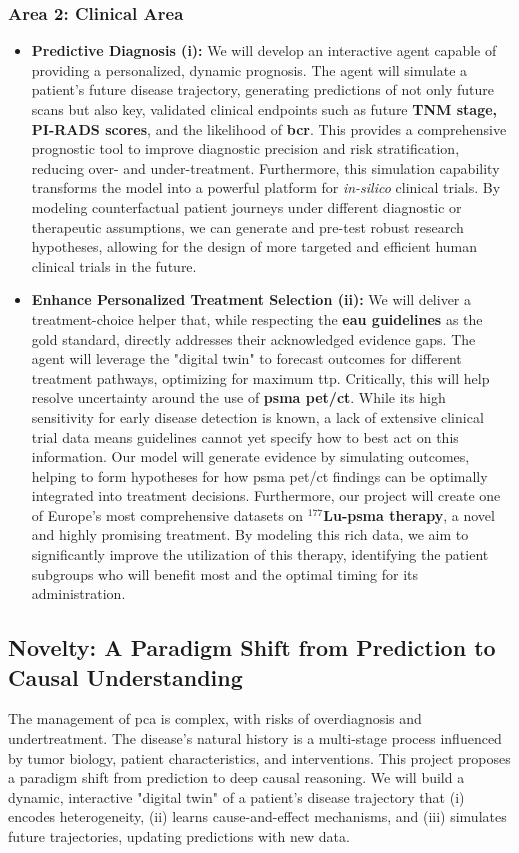 \documentclass[11pt, a4paper]{article}
\begin{document}
\subsubsection*{Area 2: Clinical Area}
\begin{itemize}
    \item \textbf{Predictive Diagnosis  (i):} We will develop an interactive agent capable of providing a personalized, dynamic prognosis. The agent will simulate a patient's future disease trajectory, generating predictions of not only future scans but also key, validated clinical endpoints such as future \textbf{TNM stage, PI-RADS scores}, and the likelihood of \textbf{\gls{bcr}}. This provides a comprehensive prognostic tool to improve diagnostic precision and risk stratification, reducing over- and under-treatment. Furthermore, this simulation capability transforms the model into a powerful platform for \textit{in-silico} clinical trials. By modeling counterfactual patient journeys under different diagnostic or therapeutic assumptions, we can generate and pre-test robust research hypotheses, allowing for the design of more targeted and efficient human clinical trials in the future.

    \item \textbf{Enhance Personalized Treatment Selection (ii):} We will deliver a treatment-choice helper that, while respecting the \textbf{\gls{eau} guidelines} as the gold standard, directly addresses their acknowledged evidence gaps. The agent will leverage the "digital twin" to forecast outcomes for different treatment pathways, optimizing for maximum \gls{ttp}. Critically, this will help resolve uncertainty around the use of \textbf{\gls{psma} \gls{pet}/\gls{ct}}. While its high sensitivity for early disease detection is known, a lack of extensive clinical trial data means guidelines cannot yet specify how to best act on this information. Our model will generate evidence by simulating outcomes, helping to form hypotheses for how \gls{psma} \gls{pet}/\gls{ct} findings can be optimally integrated into treatment decisions. Furthermore, our project will create one of Europe's most comprehensive datasets on \textbf{$^{177}$Lu-\gls{psma} therapy}, a novel and highly promising treatment. By modeling this rich data, we aim to significantly improve the utilization of this therapy, identifying the patient subgroups who will benefit most and the optimal timing for its administration.
\end{itemize}

\subsection{Novelty: A Paradigm Shift from Prediction to Causal Understanding}
The management of \gls{pca} is complex, with risks of overdiagnosis and undertreatment. The disease's natural history is a multi-stage process influenced by tumor biology, patient characteristics, and interventions. This project proposes a paradigm shift from prediction to deep causal reasoning. We will build a dynamic, interactive "digital twin" of a patient’s disease trajectory that (i) encodes heterogeneity, (ii) learns cause-and-effect mechanisms, and (iii) simulates future trajectories, updating predictions with new data.
\end{document}
